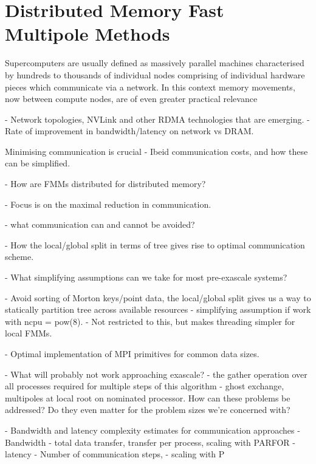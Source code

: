 
\section{Distributed Memory Fast Multipole Methods}\label{chpt:fmm:sec:distributed}

Supercomputers are usually defined as massively parallel machines characterised by hundreds to thousands of individual nodes comprising of individual hardware pieces which communicate via a network. In this context memory movements, now between compute nodes, are of even greater practical relevance

- Network topologies, NVLink and other RDMA technologies that are emerging.
- Rate of improvement in bandwidth/latency on network vs DRAM.

Minimising communication is crucial
- Ibeid communication costs, and how these can be simplified.


- How are FMMs distributed for distributed memory?

- Focus is on the maximal reduction in communication.

- what communication can and cannot be avoided?

- How the local/global split in terms of tree gives rise to optimal communication scheme.

- What simplifying assumptions can we take for most pre-exascale systems?

- Avoid sorting of Morton keys/point data, the local/global split gives us a way to statically partition tree across available resources - simplifying assumption if work with ncpu = pow(8).
- Not restricted to this, but makes threading simpler for local FMMs.

- Optimal implementation of MPI primitives for common data sizes.

- What will probably not work approaching exascale?
- the gather operation over all processes required for multiple steps of this algorithm - ghost exchange, multipoles at local root on nominated processor. How can these problems be addressed? Do they even matter for the problem sizes we're concerned with?

- Bandwidth and latency complexity estimates for communication approaches
- Bandwidth
    - total data transfer, transfer per process, scaling with PARFOR
- latency
    - Number of communication steps,
    - scaling with P

